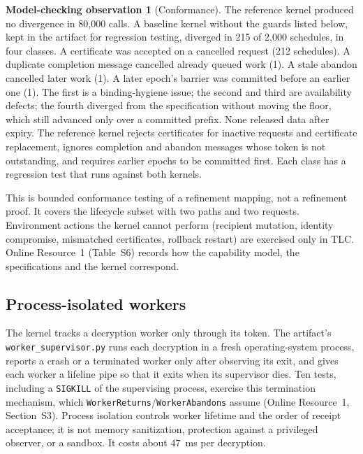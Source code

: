 \documentclass[pdflatex,sn-mathphys-num]{sn-jnl}%
\theoremstyle{plain}
\theoremstyle{definition}
\newtheorem{observation}{Model-checking observation}
\newcommand{\code}[1]{\texttt{#1}}
\begin{document}
\begin{observation}[Conformance]\label{obs:conformance}
The reference kernel produced no divergence in 80,000 calls. A baseline kernel without the guards listed below, kept in the artifact for regression testing, diverged in 215 of 2,000 schedules, in four classes. A certificate was accepted on a cancelled request (212 schedules). A duplicate completion message cancelled already queued work (1). A stale abandon cancelled later work (1). A later epoch's barrier was committed before an earlier one (1). The first is a binding-hygiene issue; the second and third are availability defects; the fourth diverged from the specification without moving the floor, which still advanced only over a committed prefix. None released data after expiry. The reference kernel rejects certificates for inactive requests and certificate replacement, ignores completion and abandon messages whose token is not outstanding, and requires earlier epochs to be committed first. Each class has a regression test that runs against both kernels.
\end{observation}

This is bounded conformance testing of a refinement mapping, not a refinement proof. It covers the lifecycle subset with two paths and two requests. Environment actions the kernel cannot perform (recipient mutation, identity compromise, mismatched certificates, rollback restart) are exercised only in TLC. Online Resource~1 (Table~S6) records how the capability model, the specifications and the kernel correspond.

\subsection{Process-isolated workers}\label{sec:supervisor}
The kernel tracks a decryption worker only through its token. The artifact's \code{worker\_supervisor.py} runs each decryption in a fresh operating-system process, reports a crash or a terminated worker only after observing its exit, and gives each worker a lifeline pipe so that it exits when its supervisor dies. Ten tests, including a \code{SIGKILL} of the supervising process, exercise this termination mechanism, which \code{WorkerReturns}/\code{WorkerAbandons} assume (Online Resource~1, Section~S3). Process isolation controls worker lifetime and the order of receipt acceptance; it is not memory sanitization, protection against a privileged observer, or a sandbox. It costs about $47$~ms per decryption.
\end{document}
